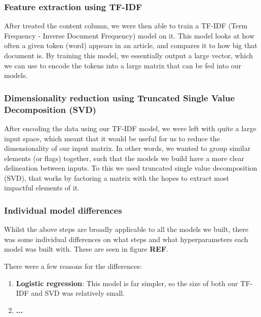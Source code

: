 \subsubsection{Feature extraction using TF-IDF}
After treated the content column, we were then able to train a TF-IDF (Term Frequency - Inverse Document Frequency)
model on it. This model looks at how often a given token (word) appears in an article, and compares it to how big that
document is. By training this model, we essentially output a large vector, which we can use to encode the tokens into a
large matrix that can be fed into our models.

\subsubsection{Dimensionality reduction using Truncated Single Value Decomposition (SVD)}
After encoding the data using our TF-IDF model, we were left with quite a large input space, which meant that it would
be useful for us to reduce the dimensionality of our input matrix. In other words, we wanted to group similar elements
(or flags) together, such that the models we build have a more clear delineation between inputs. To this we used
truncated single value decomposition (SVD), that works by factoring a matrix with the hopes to extract most impactful
elements of it.

\subsubsection{Individual model differences}
Whilst the above steps are broadly applicable to all the models we built, there was some individual differences on what
steps and what hyperparameters each model was built with. These are seen in figure \textbf{REF}.

There were a few reasons for the differences:
\begin{enumerate}
  \item \textbf{Logistic regression}: This model is far simpler, so the size of both our TF-IDF and SVD was relatively
    small.
  \item \textbf{...}
\end{enumerate}
